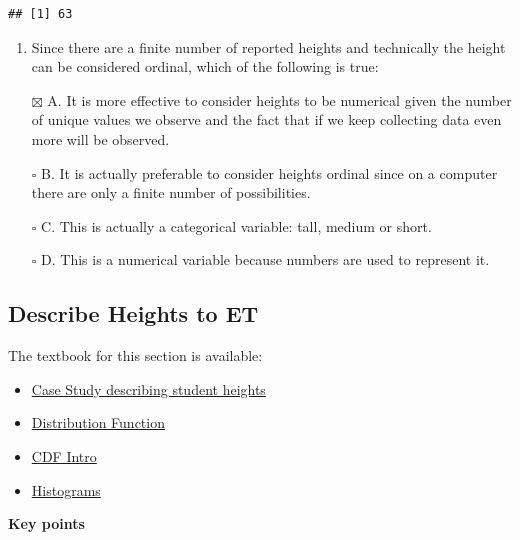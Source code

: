 \documentclass[
]{article}
\providecommand{\tightlist}{%
  \setlength{\itemsep}{0pt}\setlength{\parskip}{0pt}}
\begin{document}
\begin{verbatim}
## [1] 63
\end{verbatim}

\begin{enumerate}
\def\labelenumi{\arabic{enumi}.}
\setcounter{enumi}{5}
\tightlist
\item
  Since there are a finite number of reported heights and technically
  the height can be considered ordinal, which of the following is true:
\end{enumerate}

\begin{itemize}
\tightlist
\item[$\boxtimes$]
  A. It is more effective to consider heights to be numerical given the
  number of unique values we observe and the fact that if we keep
  collecting data even more will be observed.
\item[$\square$]
  B. It is actually preferable to consider heights ordinal since on a
  computer there are only a finite number of possibilities.
\item[$\square$]
  C. This is actually a categorical variable: tall, medium or short.
\item[$\square$]
  D. This is a numerical variable because numbers are used to represent
  it.
\end{itemize}

\hypertarget{describe-heights-to-et}{%
\subsection{Describe Heights to ET}\label{describe-heights-to-et}}

The textbook for this section is available:

\begin{itemize}
\tightlist
\item
  \href{https://rafalab.github.io/dsbook/distributions.html\#case-study-describing-student-heights}{Case
  Study describing student heights}
\item
  \href{https://rafalab.github.io/dsbook/distributions.html\#distribution-function}{Distribution
  Function}
\item
  \href{https://rafalab.github.io/dsbook/distributions.html\#cdf-intro}{CDF
  Intro}
\item
  \href{https://rafalab.github.io/dsbook/distributions.html\#histograms}{Histograms}
\end{itemize}

\textbf{Key points}
\end{document}
